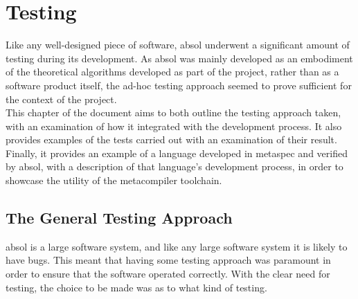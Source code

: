 



\chapter{Testing} %
\label{cha:testing}
Like any well-designed piece of software, \gls{absol} underwent a significant amount of testing during its development.
As \gls{absol} was mainly developed as an embodiment of the theoretical algorithms developed as part of the project, rather than as a software product itself, the ad-hoc testing approach seemed to prove sufficient for the context of the project.\\

This chapter of the document aims to both outline the testing approach taken, with an examination of how it integrated with the development process.
It also provides examples of the tests carried out with an examination of their result. 
Finally, it provides an example of a language developed in \gls{metaspec} and verified by \gls{absol}, with a description of that language's development process, in order to showcase the utility of the metacompiler toolchain.

\section{The General Testing Approach} %
\label{sec:the_general_testing_approach}

\gls{absol} is a large software system, and like any large software system it is likely to have bugs.
This meant that having some testing approach was paramount in order to ensure that the software operated correctly.
With the clear need for testing, the choice to be made was as to what kind of testing.\\

